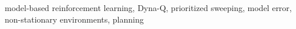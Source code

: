 model-based reinforcement learning, Dyna-Q, prioritized sweeping, model error, non-stationary environments, planning

